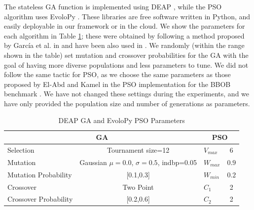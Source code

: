 \documentclass[runningheads]{llncs}
\begin{document}
The stateless GA function is implemented using DEAP
\cite{fortin2012deap}, while the PSO algorithm uses EvoloPy
\cite{faris2016evolopy}. These libraries are free software written in
Python, and easily deployable in our framework or in the cloud.  We
show the parameters for each algorithm in Table \ref{tab:GAparams};
these were obtained by following a method proposed by García et al. in
\cite{garcia2017benchmarking:anon} and have been also used in
\cite{GARCIAVALDEZ2021234:anon}. We randomly (within the range shown
in the table) set mutation and crossover probabilities for the GA with
the goal of having more diverse populations and less parameters to
tune. We did not follow the same tactic for PSO, as we choose the same
parameters as those proposed by El-Abd and Kamel in the PSO
implementation for the BBOB benchmark \cite{el2009blackHybrid}. We
have not changed these settings during the experiments, and we have
only provided the population size and number of generations as
parameters.

\begin{table}
  \small
  \caption{ DEAP GA and EvoloPy PSO Parameters }
  \label{tab:GAparams} 
  \centering
  \small
  \begin{tabular}{|l|c||l|c|}
    \hline
    \multicolumn{2}{|c||}{GA} & \multicolumn{2}{c|}{PSO} \\ \hline
    Selection & Tournament size=12 &      $V_{max}$ & 6                  \\ \hline
    Mutation & Gaussian $\mu=0.0$, $\sigma=0.5$, indbp=0.05 & $W_{max}$ & $0.9$     \\ \hline
    Mutation Probability & [0.1,0.3] &   $W_{min}$ & $0.2$                      \\ \hline
    Crossover & Two Point   &       $C_1$ & 2                             \\ \hline
    Crossover Probability  & [0.2,0.6] & $C_2$ & 2  \\ \hline
  \end{tabular}
\end{table}
\end{document}
